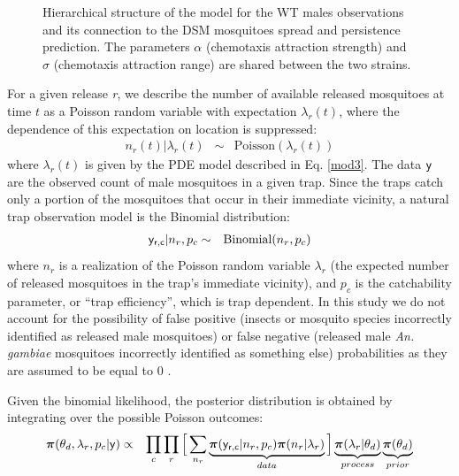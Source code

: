 \documentclass[]{bmcart}
\begin{document}
\begin{figure}

\caption{\label{fig:bhm_schematic} Hierarchical structure of the model for the WT males observations and its connection to the DSM mosquitoes spread and persistence prediction. The parameters $\alpha$ (chemotaxis attraction strength) and $\sigma$ (chemotaxis attraction range) are shared between the two strains.}
\end{figure}

For a given release \emph{r}, we describe the number of available released mosquitoes at time $t$ as a Poisson random variable with expectation $\lambda_r(t)$, where the dependence of this expectation on location is suppressed:
\begin{eqnarray}
n_r(t) | \lambda_r(t) &\sim& \textrm{Poisson}(\lambda_r(t))
\end{eqnarray}
where $\lambda_r(t)$ is given by the PDE model described in Eq. \ref{mod3}. The data ${\sf y}$ are the observed count of male mosquitoes in a given trap. Since the traps catch only a portion of the mosquitoes that occur in their immediate vicinity, a natural trap observation model is the Binomial distribution:
  \begin{eqnarray}
{\sf y_{r,c}} | n_r, p_c &\sim& \textrm{Binomial}(n_r, p_c)
\end{eqnarray}
where $n_r$ is a realization of the Poisson random variable $\lambda_r$ (the expected number of released mosquitoes in the trap's immediate vicinity), and $p_c$ is the catchability parameter, or ``trap efficiency'', which is trap dependent. In this study we do not account for the possibility of false positive (insects or mosquito species incorrectly identified as released male mosquitoes) or false negative (released male \textit{An. gambiae} mosquitoes incorrectly identified as something else) probabilities as they are assumed to be equal to $0$ \citep{Epopa2017}.

Given the  binomial likelihood, the posterior distribution is obtained by integrating over the possible Poisson outcomes:
  \begin{eqnarray}
{\bm \pi}(\theta_d, \lambda_r, {p_c} | {\sf y}) &\propto & \prod_c \prod_r \Big[ \sum_{n_r}  \underbrace{{\bm \pi}({\sf y_{r,c}} | n_r, p_c) {\bm \pi}(n_r | \lambda_r)}_{data}  \Big] \underbrace{{\bm \pi}(\lambda_r | \theta_d)}_{process} \underbrace{{\bm \pi}( \theta_d)}_{prior} 
\end{eqnarray}
\end{document}
